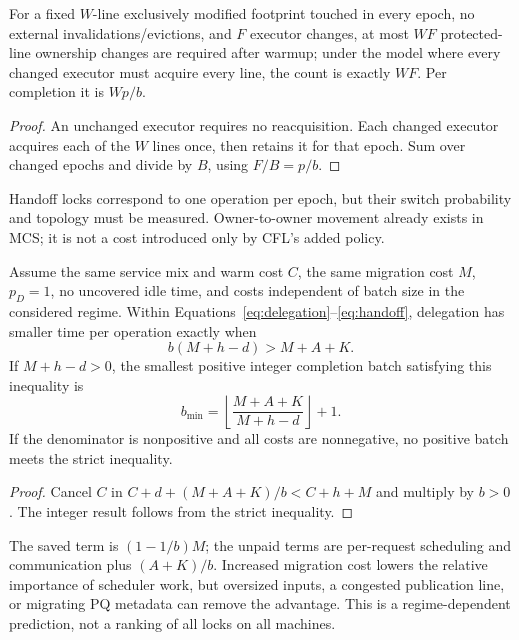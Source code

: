 \begin{corollary}
For a fixed $W$-line exclusively modified footprint touched in every epoch,
no external invalidations/evictions, and $F$ executor changes, at most $WF$
protected-line ownership changes are required after warmup; under the model
where every changed executor must acquire every line, the count is exactly
$WF$. Per completion it is $Wp/b$.
\end{corollary}
\begin{proof}
An unchanged executor requires no reacquisition. Each changed executor
acquires each of the $W$ lines once, then retains it for that epoch.
Sum over changed epochs and divide by $B$, using $F/B=p/b$.
\end{proof}
Handoff locks correspond to one operation per epoch, but their switch
probability and topology must be measured. Owner-to-owner movement already
exists in MCS; it is not a cost introduced only by CFL's added policy.

\begin{proposition}
\label{prop:crossover}
Assume the same service mix and warm cost $C$, the same migration cost $M$,
$p_D=1$, no uncovered idle time, and costs independent of batch size in the
considered regime. Within Equations~\eqref{eq:delegation}--\eqref{eq:handoff},
delegation has smaller time per operation exactly when
\begin{equation}
 b(M+h-d)>M+A+K .\label{eq:crossover}
\end{equation}
If $M+h-d>0$, the smallest positive integer completion batch satisfying this
inequality is
\begin{equation}
 b_{\min}=\left\lfloor\frac{M+A+K}{M+h-d}\right\rfloor+1.
\end{equation}
If the denominator is nonpositive and all costs are nonnegative, no positive
batch meets the strict inequality.
\end{proposition}
\begin{proof}
Cancel $C$ in $C+d+(M+A+K)/b<C+h+M$ and multiply by $b>0$.
The integer result follows from the strict inequality.
\end{proof}
The saved term is $(1-1/b)M$; the unpaid terms are per-request scheduling and
communication plus $(A+K)/b$. Increased migration cost lowers the relative
importance of scheduler work, but oversized inputs, a congested publication
line, or migrating PQ metadata can remove the advantage. This is a
regime-dependent prediction, not a ranking of all locks on all machines.

